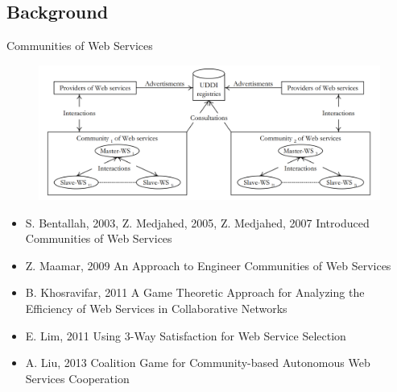 \documentclass{beamer}
\begin{document}
\subsection{Background}
\begin{frame}{Communities of Web Services}
    \begin{figure}[htbp]
        \centering
        \includegraphics[width=1.0 \columnwidth]{figures/wscommunity2.png}
    \end{figure}

    \tiny
    \begin{itemize}
      \item {\color{blue}\lbrack S. Bentallah, 2003\rbrack, \lbrack Z. Medjahed, 2005\rbrack, \lbrack Z. Medjahed, 2007\rbrack} Introduced Communities of Web Services
      \item {\color{blue}\lbrack Z. Maamar, 2009\rbrack} An Approach to Engineer Communities of Web Services
      \item {\color{blue}\lbrack B. Khosravifar, 2011\rbrack} A Game Theoretic Approach for Analyzing the Efficiency of Web Services in Collaborative Networks
      \item {\color{blue}\lbrack E. Lim, 2011\rbrack} Using 3-Way Satisfaction for Web Service Selection
      \item {\color{blue}\lbrack A. Liu, 2013\rbrack} Coalition Game for Community-based Autonomous Web Services Cooperation
    \end{itemize}                      	      	
\end{frame}

\end{document}
